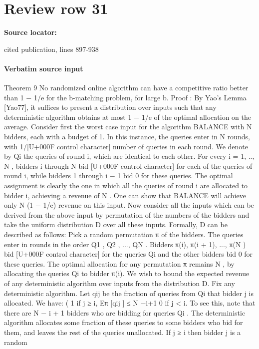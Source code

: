 \documentclass[10pt]{article}
\begin{document}
\section*{Review row 31}
\textbf{Source locator:} {\footnotesize\raggedright cited publication, lines 897-\allowbreak{}938\par}
\paragraph{Verbatim source input}
\begin{ReviewVerbatim}
Theorem 9 No randomized online algorithm can have a competitive ratio better than 1 − 1/e
for the b-matching problem, for large b.
Proof : By Yao’s Lemma [Yao77], it suffices to present a distribution over inputs such that
any deterministic algorithm obtains at most 1 − 1/e of the optimal allocation on the average.
Consider first the worst case input for the algorithm BALANCE with N bidders, each with
a budget of 1. In this instance, the queries enter in N rounds, with 1/[U+000F control character] number of queries in
each round. We denote by Qi the queries of round i, which are identical to each other. For
every i = 1, .., N , bidders i through N bid [U+000F control character] for each of the queries of round i, while bidders 1
through i − 1 bid 0 for these queries. The optimal assignment is clearly the one in which all
the queries of round i are allocated to bidder i, achieving a revenue of N . One can show that
BALANCE will achieve only N (1 − 1/e) revenue on this input.
Now consider all the inputs which can be derived from the above input by permutation of the
numbers of the bidders and take the uniform distribution D over all these inputs. Formally, D
can be described as follows: Pick a random permutation π of the bidders. The queries enter
in rounds in the order Q1 , Q2 , ..., QN . Bidders π(i), π(i + 1), ..., π(N ) bid [U+000F control character] for the queries Qi
and the other bidders bid 0 for these queries. The optimal allocation for any permutation
π remains N , by allocating the queries Qi to bidder π(i). We wish to bound the expected
revenue of any deterministic algorithm over inputs from the distribution D.
Fix any deterministic algorithm. Let qij be the fraction of queries from Qi that bidder j is
allocated. We have:
(
1
if j ≥ i,
Eπ [qij ] ≤ N −i+1
0
if j < i.
To see this, note that there are N − i + 1 bidders who are bidding for queries Qi . The
deterministic algorithm allocates some fraction of these queries to some bidders who bid for
them, and leaves the rest of the queries unallocated. If j ≥ i then bidder j is a random

\end{ReviewVerbatim}
\end{document}

